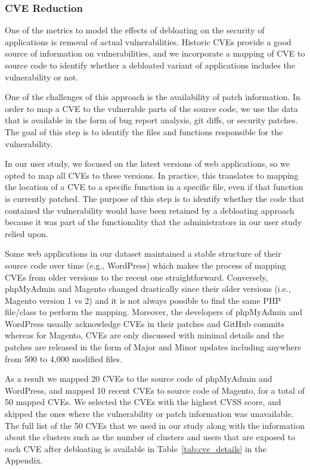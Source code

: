 \subsubsection{CVE Reduction}

One of the metrics to model the effects of debloating on the security of applications is removal of actual vulnerabilities. 
Historic CVEs provide a good source of information on vulnerabilities, and we incorporate a mapping of CVE to source code to identify whether a debloated variant of applications includes the vulnerability or not. 

One of the challenges of this approach is the availability of patch information. 
In order to map a CVE to the vulnerable parts of the source code, we use the data that is available in the form of bug report analysis, git diffs, or security patches. 
The goal of this step is to identify the files and functions responsible for the vulnerability. 

In our user study, we focused on the latest versions of web applications, so we opted to map all CVEs to these versions. 
In practice, this translates to mapping the location of a CVE to a specific function in a specific file, even if that function is currently patched. 
The purpose of this step is to identify whether the code that contained the vulnerability would have been retained by a debloating approach because it was part of the functionality that the administrators in our user study relied upon.

Some web applications in our dataset maintained a stable structure of their source code over time (e.g., WordPress) which makes the process of mapping CVEs from older versions to the recent one straightforward. 
Conversely, phpMyAdmin and Magento changed drastically since their older versions (i.e., Magento version 1 vs 2) and it is not always possible to find the same PHP file/class to perform the mapping. 
Moreover, the developers of phpMyAdmin and WordPress usually acknowledge CVEs in their patches and GitHub commits whereas for Magento, CVEs are only discussed with minimal details and the patches are released in the form of Major and Minor updates including anywhere from 500 to 4,000 modified files.

As a result we mapped 20 CVEs to the source code of phpMyAdmin and WordPress, and mapped 10 recent CVEs to source code of Magento, for a total of 50 mapped CVEs. 
We selected the CVEs with the highest CVSS score, and skipped the ones where the vulnerability or patch information was unavailable. 
The full list of the 50 CVEs that we used in our study along with the information about the \sys{} clusters such as the number of clusters and users that are exposed to each CVE after debloating is available in Table~\ref{tab:cve_details} in the Appendix. 

